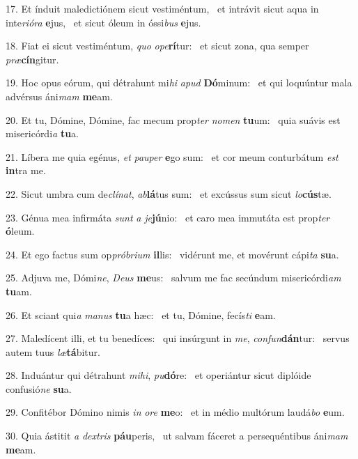 17. Et índuit maledictiónem sicut vestiméntum, \dag\  et intrávit sicut aqua in inte\textit{ri}\textit{ó}\textit{ra} \textbf{e}jus, \ast\  et sicut óleum in óssi\textit{bus} \textbf{e}jus.\

18. Fiat ei sicut vestiméntum, \textit{quo} \textit{o}\textit{pe}\textbf{rí}tur: \ast\  et sicut zona, qua semper \textit{præ}\textbf{cín}gitur.\

19. Hoc opus eórum, qui détrahunt mi\textit{hi} \textit{a}\textit{pud} \textbf{Dó}minum: \ast\  et qui loquúntur mala advérsus áni\textit{mam} \textbf{me}am.\

20. Et tu, Dómine, Dómine, fac mecum prop\textit{ter} \textit{no}\textit{men} \textbf{tu}um: \ast\  quia suávis est misericórdi\textit{a} \textbf{tu}a.\

21. Líbera me quia egénus, \textit{et} \textit{pau}\textit{per} \textbf{e}go sum: \ast\  et cor meum conturbátum \textit{est} \textbf{in}tra me.\

22. Sicut umbra cum de\textit{clí}\textit{nat}, \textit{ab}\textbf{lá}tus sum: \ast\  et excússus sum sicut \textit{lo}\textbf{cús}tæ.\

23. Génua mea infirmáta \textit{sunt} \textit{a} \textit{je}\textbf{jú}nio: \ast\  et caro mea immutáta est prop\textit{ter} \textbf{ó}leum.\

24. Et ego factus sum op\textit{pró}\textit{bri}\textit{um} \textbf{il}lis: \ast\  vidérunt me, et movérunt cápi\textit{ta} \textbf{su}a.\

25. Adjuva me, Dómi\textit{ne}, \textit{De}\textit{us} \textbf{me}us: \ast\  salvum me fac secúndum misericórdi\textit{am} \textbf{tu}am.\

26. Et sciant qui\textit{a} \textit{ma}\textit{nus} \textbf{tu}a hæc: \ast\  et tu, Dómine, fecís\textit{ti} \textbf{e}am.\

27. Maledícent illi, et tu benedíces: \dag\  qui insúrgunt in \textit{me}, \textit{con}\textit{fun}\textbf{dán}tur: \ast\  servus autem tuus \textit{læ}\textbf{tá}bitur.\

28. Induántur qui détrahunt \textit{mi}\textit{hi}, \textit{pu}\textbf{dó}re: \ast\  et operiántur sicut diplóide confusió\textit{ne} \textbf{su}a.\

29. Confitébor Dómino nimis \textit{in} \textit{o}\textit{re} \textbf{me}o: \ast\  et in médio multórum laudá\textit{bo} \textbf{e}um.\

30. Quia ástitit \textit{a} \textit{dex}\textit{tris} \textbf{páu}peris, \ast\  ut salvam fáceret a persequéntibus áni\textit{mam} \textbf{me}am.\

